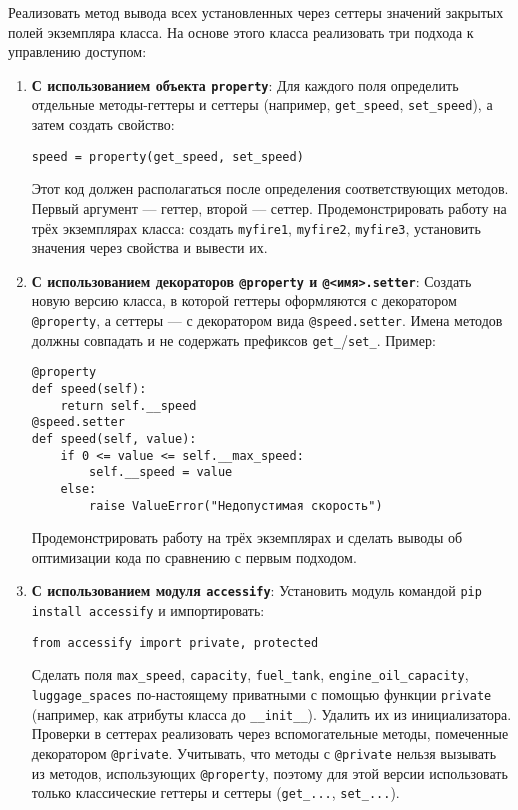 \begin{enumerate}
\begin{itemize}
\end{itemize}
Реализовать метод вывода всех установленных через сеттеры значений закрытых полей экземпляра класса.
На основе этого класса реализовать три подхода к управлению доступом:
\begin{enumerate}
    \item \textbf{С использованием объекта \texttt{property}}:  
    Для каждого поля определить отдельные методы-геттеры и сеттеры (например, \texttt{get\_speed}, \texttt{set\_speed}), а затем создать свойство:  
    \begin{verbatim}
speed = property(get_speed, set_speed)
    \end{verbatim}  
    Этот код должен располагаться после определения соответствующих методов. Первый аргумент — геттер, второй — сеттер.  
    Продемонстрировать работу на трёх экземплярах класса: создать \texttt{myfire1}, \texttt{myfire2}, \texttt{myfire3}, установить значения через свойства и вывести их.
    \item \textbf{С использованием декораторов \texttt{@property} и \texttt{@<имя>.setter}}:  
    Создать новую версию класса, в которой геттеры оформляются с декоратором \texttt{@property}, а сеттеры — с декоратором вида \texttt{@speed.setter}. Имена методов должны совпадать и не содержать префиксов \texttt{get\_}/\texttt{set\_}.  
    Пример:  
    \begin{verbatim}
@property
def speed(self):
    return self.__speed
@speed.setter
def speed(self, value):
    if 0 <= value <= self.__max_speed:
        self.__speed = value
    else:
        raise ValueError("Недопустимая скорость")
    \end{verbatim}  
    Продемонстрировать работу на трёх экземплярах и сделать выводы об оптимизации кода по сравнению с первым подходом.
    \item \textbf{С использованием модуля \texttt{accessify}}:  
    Установить модуль командой \texttt{pip install accessify} и импортировать:  
    \begin{verbatim}
from accessify import private, protected
    \end{verbatim}  
    Сделать поля \texttt{max\_speed}, \texttt{capacity}, \texttt{fuel\_tank}, \texttt{engine\_oil\_capacity}, \texttt{luggage\_spaces} по-настоящему приватными с помощью функции \texttt{private} (например, как атрибуты класса до \texttt{\_\_init\_\_}). Удалить их из инициализатора.  
    Проверки в сеттерах реализовать через вспомогательные методы, помеченные декоратором \texttt{@private}.  
    Учитывать, что методы с \texttt{@private} нельзя вызывать из методов, использующих \texttt{@property}, поэтому для этой версии использовать только классические геттеры и сеттеры (\texttt{get\_...}, \texttt{set\_...}).  

\end{enumerate}
\end{enumerate}
